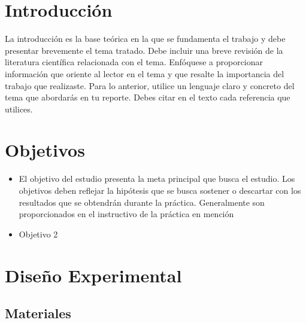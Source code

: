 \documentclass[osajnl,showpacs,superscriptaddress,10pt]{article}
\begin{document}

\setlength{\columnsep}{1cm}
\begin{multicols}{2}


\section{Introducción}


La introducción es la base teórica en la que se fundamenta el trabajo y debe presentar
brevemente el tema tratado.
Debe incluir una breve revisión de la literatura científica relacionada con el tema. Enfóquese a
proporcionar información que oriente al lector en el tema y que resalte la importancia del
trabajo que realizaste. Para lo anterior, utilice un lenguaje claro y concreto del tema que
abordarás en tu reporte. Debes citar en el texto cada referencia que utilices.




\section{Objetivos}


\begin{itemize}
    \item El objetivo del estudio presenta la meta principal que busca el estudio. Los objetivos deben reflejar la hipótesis que se busca sostener o descartar con los resultados que se obtendrán
durante la práctica. Generalmente son proporcionados en el instructivo de la práctica en
mención


    \item Objetivo 2
\end{itemize}

\section{Diseño Experimental}

\subsection{Materiales}


\end{multicols}
\end{document}
